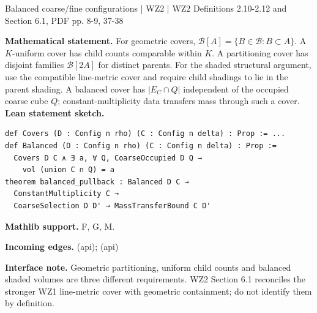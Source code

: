 \documentclass[10pt,a4paper]{article}
\newcommand{\nodecard}[1]{\hyperlink{node-#1}{\texttt{\detokenize{#1}}}}
\begin{document}
\begin{minipage}{\linewidth}
\hypertarget{node-Icover}{}
\begin{tcolorbox}[colback=white,colframe=apifg,colbacktitle=apibg,coltitle=ink,boxrule=0.45pt,arc=1.6mm,left=3mm,right=3mm,top=2mm,bottom=2mm,title={\sffamily\bfseries Cover API \hfill \texttt{Icover}}]
{\sffamily\small\color{muted}Balanced coarse/fine configurations | WZ2 | WZ2 Definitions 2.10-2.12 and Section 6.1, PDF pp. 8-9, 37-38}\par
\textbf{Mathematical statement.} For geometric covers, $\mathcal B[A]=\{B\in\mathcal B:B\subset A\}$.
A $K$-uniform cover has child counts comparable within $K$. A partitioning cover has disjoint families $\mathcal B[2A]$ for distinct parents.
For the shaded structural argument, use the compatible line-metric cover and require child shadings to lie in the parent shading.
A balanced cover has $|E_C\cap Q|$ independent of the occupied coarse cube $Q$; constant-multiplicity data transfers mass through such a cover.
\smallskip\textbf{Lean statement sketch.}
\begin{Verbatim}[fontsize=\small,breaklines=true,breakanywhere=true,tabsize=2]
def Covers (D : Config n rho) (C : Config n delta) : Prop := ...
def Balanced (D : Config n rho) (C : Config n delta) : Prop :=
  Covers D C ∧ ∃ a, ∀ Q, CoarseOccupied D Q →
    vol (union C ∩ Q) = a
theorem balanced_pullback : Balanced D C →
  ConstantMultiplicity C →
  CoarseSelection D D' → MassTransferBound C D'
\end{Verbatim}
{\footnotesize\textbf{Mathlib support.} F, G, M.\par
\textbf{Incoming edges.} \nodecard{Igeom} (api); \nodecard{Imass} (api)\par}
{\footnotesize\textbf{Interface note.} Geometric partitioning, uniform child counts and balanced shaded volumes are three different requirements. WZ2 Section 6.1 reconciles the stronger WZ1 line-metric cover with geometric containment; do not identify them by definition.}
\end{tcolorbox}\end{minipage}\par\medskip
\end{document}

